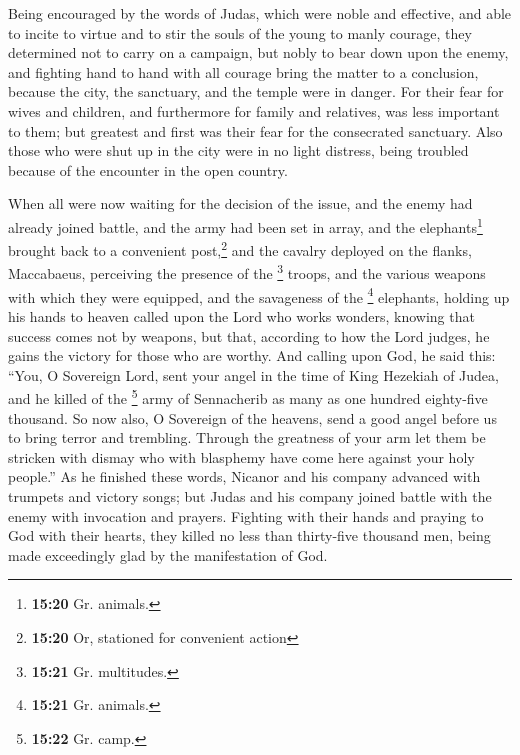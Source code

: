  Being encouraged by the words of Judas, which were noble
and effective, and able to incite to virtue and to stir the souls of the
young to manly courage, they determined not to carry on a campaign, but
nobly to bear down upon the enemy, and fighting hand to hand with all
courage bring the matter to a conclusion, because the city, the
sanctuary, and the temple were in danger.  For their fear
for wives and children, and furthermore for family and relatives, was
less important to them; but greatest and first was their fear for the
consecrated sanctuary.  Also those who were shut up in
the city were in no light distress, being troubled because of the
encounter in the open country.

 When all were now waiting for the decision of the issue,
and the enemy had already joined battle, and the army had been set in
array, and the elephants\footnote{\textbf{15:20} Gr. animals.} brought
back to a convenient post,\footnote{\textbf{15:20} Or, stationed for
  convenient action} and the cavalry deployed on the flanks,
 Maccabaeus, perceiving the presence of the \footnote{\textbf{15:21}
  Gr. multitudes.} troops, and the various weapons with which they were
equipped, and the savageness of the \footnote{\textbf{15:21} Gr.
  animals.} elephants, holding up his hands to heaven called upon the
Lord who works wonders, knowing that success comes not by weapons, but
that, according to how the Lord judges, he gains the victory for those
who are worthy.  And calling upon God, he said this:
``You, O Sovereign Lord, sent your angel in the time of King Hezekiah of
Judea, and he killed of the \footnote{\textbf{15:22} Gr. camp.} army of
Sennacherib as many as one hundred eighty-five thousand. 
So now also, O Sovereign of the heavens, send a good angel before us to
bring terror and trembling.  Through the greatness of
your arm let them be stricken with dismay who with blasphemy have come
here against your holy people.'' As he finished these words,
 Nicanor and his company advanced with trumpets and
victory songs;  but Judas and his company joined battle
with the enemy with invocation and prayers.  Fighting
with their hands and praying to God with their hearts, they killed no
less than thirty-five thousand men, being made exceedingly glad by the
manifestation of God.

